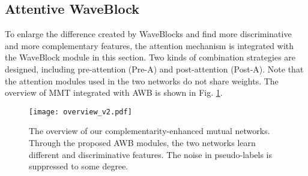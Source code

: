 \documentclass[journal]{IEEEtran}
\begin{document}
\subsection{Attentive WaveBlock}
To enlarge the difference created by WaveBlocks and find more discriminative and more complementary features, the attention mechanism is integrated with the WaveBlock module in this section. Two kinds of combination strategies are designed, including pre-attention (Pre-A) and post-attention (Post-A).  Note that the attention modules used in the two networks do not share weights. The overview of MMT \cite{ge2020mutual} integrated with AWB is shown in Fig. \ref{overview}.

\begin{figure}[t]  
\centering  
\texttt{[image: overview\_v2.pdf]} 
\caption{The overview of our complementarity-enhanced mutual networks. Through the proposed AWB modules, the two networks learn different and discriminative features. The noise in pseudo-labels is suppressed to some degree.}  
\label{overview}  
\end{figure}
\end{document}
